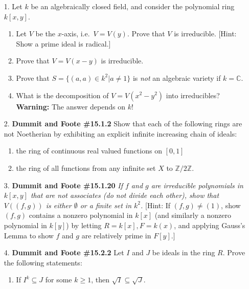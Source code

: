 \documentclass[12pt]{article}
\newcommand{\Z}{\mathbb{Z}}
\newcommand{\C}{\mathbb{C}}
\begin{document}
\begin{enumerate}

\item[1.] Let $k$ be an algebraically closed field, and consider the polynomial ring $k[x,y]$.  
  \begin{enumerate}
  \item Let $V$ be the $x$-axis, i.e.~$V = V(y)$. Prove that $V$ is irreducible. [Hint: Show a prime ideal is radical.]
  
  \item Prove that $V = V(x - y)$ is irreducible. 
  
  \item Prove that $S = \{(a,a) \in k^2 |a \neq 1\}$ is \emph{not} an algebraic variety if $k = \C$.

  \item What is the decomposition of $V = V(x^2 - y^2)$ into irreducibles?  \textbf{Warning:} The answer depends on $k$!
  \end{enumerate}

\item[2.] \textbf{Dummit and Foote \#15.1.2} Show that each of the following rings are not Noetherian by exhibiting an explicit infinite increasing chain of ideals:

\begin{enumerate}
\item the ring of continuous real valued functions on $[0, 1]$

\item the ring of all functions from any infinite set $X$ to $\Z/2\Z$.

\end{enumerate}

\item[3.] \textbf{Dummit and Foote \#15.1.20} \textit{If $f$ and $g$ are irreducible polynomials in $k[x, y]$ that are not associates (do not divide each other), show that $V((f, g))$ is either $\emptyset$ or a finite set in $k^2$.} [Hint: If $(f, g) \ne (1)$, show $(f, g)$ contains a nonzero polynomial in $k[x]$ (and similarly a nonzero polynomial in $k[y]$) by letting $R = k[x], F = k(x)$, and applying Gauss's Lemma to show $f$ and $g$ are relatively prime in $F[y]$.]

\item[4.] \textbf{Dummit and Foote \#15.2.2} Let $I$ and $J$ be ideals in the ring $R$. Prove the following statements:
\begin{enumerate}
\item If $I^k\subseteq J$ for some $k\ge 1$, then $\sqrt{I}\subseteq\sqrt{J}$.


\end{enumerate}
\end{enumerate}
\end{document}
